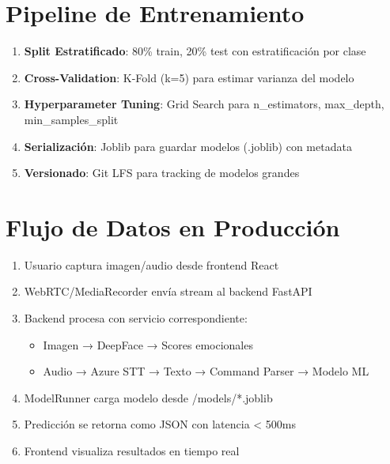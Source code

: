 \section{Pipeline de Entrenamiento}

\begin{enumerate}
    \item \textbf{Split Estratificado}: 80\% train, 20\% test con estratificación por clase
    \item \textbf{Cross-Validation}: K-Fold (k=5) para estimar varianza del modelo
    \item \textbf{Hyperparameter Tuning}: Grid Search para n\_estimators, max\_depth, min\_samples\_split
    \item \textbf{Serialización}: Joblib para guardar modelos (.joblib) con metadata
    \item \textbf{Versionado}: Git LFS para tracking de modelos grandes
\end{enumerate}

\section{Flujo de Datos en Producción}

\begin{enumerate}
    \item Usuario captura imagen/audio desde frontend React
    \item WebRTC/MediaRecorder envía stream al backend FastAPI
    \item Backend procesa con servicio correspondiente:
        \begin{itemize}
            \item Imagen → DeepFace → Scores emocionales
            \item Audio → Azure STT → Texto → Command Parser → Modelo ML
        \end{itemize}
    \item ModelRunner carga modelo desde /models/*.joblib
    \item Predicción se retorna como JSON con latencia < 500ms
    \item Frontend visualiza resultados en tiempo real
\end{enumerate}

